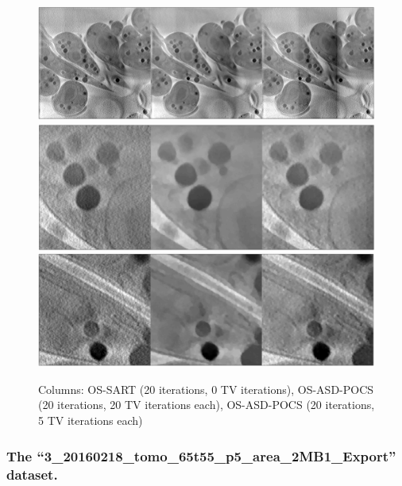 \begin{figure}
\begin{center}

\includegraphics[width=\textwidth]{Applications/OSSART_0_20_5_TViters.png} 
\includegraphics[width=\textwidth]{Applications/OSSART_0_20_5_TVitersz1.png} 
\includegraphics[width=\textwidth]{Applications/OSSART_0_20_5_TVitersz2.png} 

\end{center}

\caption{\label{fig:OStv}Columns: OS-SART (20 iterations, 0 TV iterations), OS-ASD-POCS (20 iterations, 20 TV iterations each), OS-ASD-POCS (20 iterations, 5 TV iterations each)} 
\end{figure}

\FloatBarrier

\subsubsection{The ``3\_20160218\_tomo\_65t55\_p5\_area\_2MB1\_Export'' dataset.}



